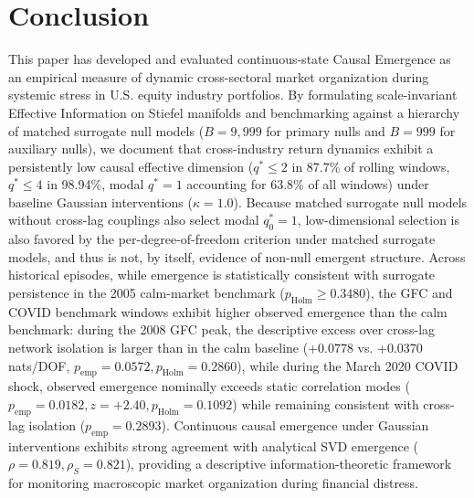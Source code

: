 \documentclass[review,12pt,authoryear]{elsarticle}
\begin{document}
\section{Conclusion}
\label{sec:conclusion}

This paper has developed and evaluated continuous-state Causal Emergence as an empirical measure of dynamic cross-sectoral market organization during systemic stress in U.S. equity industry portfolios. By formulating scale-invariant Effective Information on Stiefel manifolds and benchmarking against a hierarchy of matched surrogate null models ($B=9,999$ for primary nulls and $B=999$ for auxiliary nulls), we document that cross-industry return dynamics exhibit a persistently low causal effective dimension ($q^* \le 2$ in 87.7\% of rolling windows, $q^* \le 4$ in 98.94\%, modal $q^* = 1$ accounting for 63.8\% of all windows) under baseline Gaussian interventions ($\kappa = 1.0$). Because matched surrogate null models without cross-lag couplings also select modal $q_0^* = 1$, low-dimensional selection is also favored by the per-degree-of-freedom criterion under matched surrogate models, and thus is not, by itself, evidence of non-null emergent structure. Across historical episodes, while emergence is statistically consistent with surrogate persistence in the 2005 calm-market benchmark ($p_{\text{Holm}} \ge 0.3480$), the GFC and COVID benchmark windows exhibit higher observed emergence than the calm benchmark: during the 2008 GFC peak, the descriptive excess over cross-lag network isolation is larger than in the calm baseline (+0.0778 vs. +0.0370 nats/DOF, $p_{\text{emp}} = 0.0572, p_{\text{Holm}} = 0.2860$), while during the March 2020 COVID shock, observed emergence nominally exceeds static correlation modes ($p_{\text{emp}} = 0.0182, z = +2.40, p_{\text{Holm}} = 0.1092$) while remaining consistent with cross-lag isolation ($p_{\text{emp}} = 0.2893$). Continuous causal emergence under Gaussian interventions exhibits strong agreement with analytical SVD emergence ($\rho = 0.819, \rho_S = 0.821$), providing a descriptive information-theoretic framework for monitoring macroscopic market organization during financial distress.

\appendix
\end{document}
